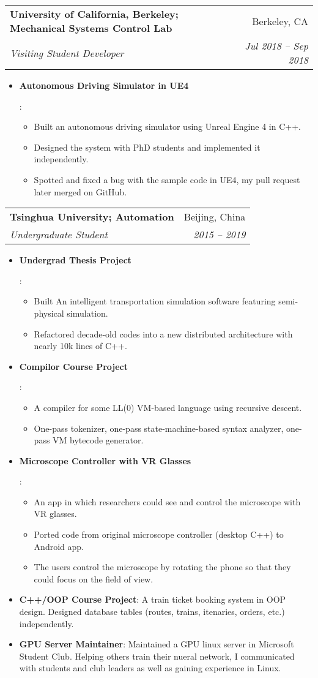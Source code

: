\documentclass[letterpaper,11pt]{article}
\makeatletter
\newcommand{\resumeItem}[2]{
  \item\small{
    \textbf{#1}{: #2 \vspace{-2pt}}
  }
}
\newcommand{\resumeSubheading}[4]{
  \vspace{-1pt}\item
    \begin{tabular*}{0.97\textwidth}[t]{l@{\extracolsep{\fill}}r}
      \textbf{#1} & #2 \\
      \textit{\small#3} & \textit{\small #4} \\
    \end{tabular*}\vspace{-5pt}
}
\newcommand{\resumeItemListStart}{\begin{itemize}}
\newcommand{\resumeItemListEnd}{\end{itemize}\vspace{-5pt}}
\makeatother
\begin{document}
    \resumeSubheading
      {University of California, Berkeley; Mechanical Systems Control Lab}{Berkeley, CA}
      {Visiting Student Developer}{Jul 2018 -- Sep 2018}
      \resumeItemListStart
        \resumeItem{Autonomous Driving Simulator in UE4}{
          \begin{itemize}
            \item Built an autonomous driving simulator using Unreal Engine 4 in C++.
            \item Designed the system with PhD students and implemented it independently.
            \item Spotted and fixed a bug with the sample code in UE4, my pull request later merged on GitHub. 
          \end{itemize}
        }
      \resumeItemListEnd

    \resumeSubheading
      {Tsinghua University; Automation}{Beijing, China}
      {Undergraduate Student}{2015 -- 2019}
      \resumeItemListStart
        \resumeItem{Undergrad Thesis Project}{
          \begin{itemize}
            \item Built An intelligent transportation simulation software featuring semi-physical simulation.
            \item Refactored decade-old codes into a new distributed architecture with nearly 10k lines of C++.
          \end{itemize}
        }
        \resumeItem{Compilor Course Project}{
          \begin{itemize}
            \item A compiler for some LL(0) VM-based language using recursive descent.
            \item One-pass tokenizer, one-pass state-machine-based syntax analyzer, one-pass VM bytecode generator.
          \end{itemize}
        }
        \resumeItem{Microscope Controller with VR Glasses}{
          \begin{itemize}
            \item An app in which researchers could see and control the microscope with VR glasses.
            \item Ported code from original microscope controller (desktop C++) to Android app.
            \item The users control the microscope by rotating the phone so that they could focus on the field of view.
          \end{itemize}
        }
        \resumeItem{C++/OOP Course Project}{
          A train ticket booking system in OOP design.
          Designed database tables (routes, trains, itenaries, orders, etc.) independently.
        }
        \resumeItem{GPU Server Maintainer}{
          Maintained a GPU linux server in Microsoft Student Club.
          Helping others train their nueral network, I communicated with students and club leaders as well as gaining experience in Linux.
        }
      \resumeItemListEnd
\end{document}
